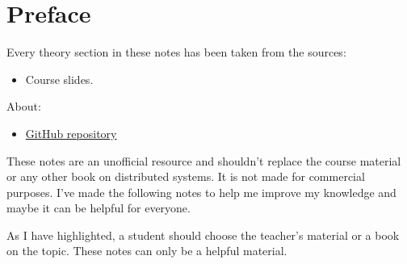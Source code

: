 \section*{Preface}

Every theory section in these notes has been taken from the sources:
\begin{itemize}
    \item Course slides.\cite{distributed-systems-polimi}
\end{itemize}
About:
\begin{itemize}
    \item[\faIcon{github}] \href{https://github.com/PoliMI-HPC-E-notes-projects-AndreVale69/HPC-E-PoliMI-university-notes}{GitHub repository}
        \begin{center}
        \end{center}
\end{itemize}
These notes are an unofficial resource and shouldn't replace the course material or any other book on distributed systems. It is not made for commercial purposes. I've made the following notes to help me improve my knowledge and maybe it can be helpful for everyone.

As I have highlighted, a student should choose the teacher's material or a book on the topic. These notes can only be a helpful material.